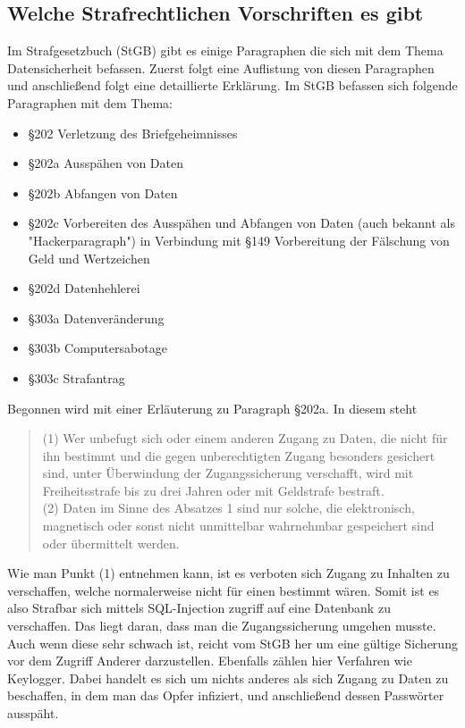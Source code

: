 \documentclass[10pt,a4paper]{article}
\begin{document}
\subsection*{Welche Strafrechtlichen Vorschriften es gibt}
Im Strafgesetzbuch (StGB) gibt es einige Paragraphen die sich mit dem Thema Datensicherheit befassen. Zuerst folgt eine Auflistung von diesen Paragraphen und anschließend folgt eine detaillierte Erklärung. Im StGB befassen sich folgende Paragraphen mit dem Thema:
\begin{itemize}
	\item §202 Verletzung des Briefgeheimnisses
	\item §202a Ausspähen von Daten
	\item §202b Abfangen von Daten
	\item §202c Vorbereiten des Ausspähen und Abfangen von Daten (auch bekannt als "Hackerparagraph") in Verbindung mit §149 Vorbereitung der Fälschung von Geld und Wertzeichen
	\item §202d Datenhehlerei
	\item §303a Datenveränderung
	\item §303b Computersabotage
	\item §303c Strafantrag 
\end{itemize}
Begonnen wird mit einer Erläuterung zu Paragraph §202a. In diesem steht
\begin{quote}
(1) Wer unbefugt sich oder einem anderen Zugang zu Daten, die nicht für ihn bestimmt und die gegen unberechtigten Zugang besonders gesichert sind, unter Überwindung der Zugangssicherung verschafft, wird mit Freiheitsstrafe bis zu drei Jahren oder mit Geldstrafe bestraft.\\
(2) Daten im Sinne des Absatzes 1 sind nur solche, die elektronisch, magnetisch oder sonst nicht unmittelbar wahrnehmbar gespeichert sind oder übermittelt werden.
\end{quote}

Wie man Punkt (1) entnehmen kann, ist es verboten sich Zugang zu Inhalten zu verschaffen, welche normalerweise nicht für einen bestimmt wären. Somit ist es also Strafbar sich mittels SQL-Injection zugriff auf eine Datenbank zu verschaffen. Das liegt daran, dass man die Zugangssicherung umgehen musste. Auch wenn diese sehr schwach ist, reicht vom StGB her um eine gültige Sicherung vor dem Zugriff Anderer darzustellen. Ebenfalls zählen hier Verfahren wie Keylogger. Dabei handelt es sich um nichts anderes als sich Zugang zu Daten zu beschaffen, in dem man das Opfer infiziert, und anschließend dessen Passwörter ausspäht. 
\end{document}
